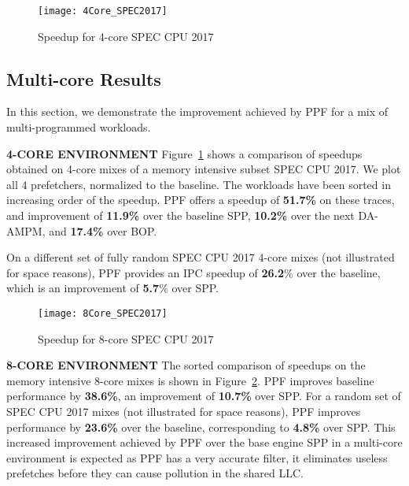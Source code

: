 \begin{figure}[ht]
\texttt{[image: 4Core\_SPEC2017]}
\caption{Speedup for 4-core SPEC CPU 2017}
\label{Fig:4Core_SPEC2017}
\end{figure}

\subsection{Multi-core Results}
\label{Results-Multi}
In this section, we demonstrate the improvement achieved by PPF for a mix of
multi-programmed workloads.
\newline

\noindent \textbf{4-CORE ENVIRONMENT}
\newline
Figure~\ref{Fig:4Core_SPEC2017} shows a comparison of speedups obtained on
4-core mixes of a memory intensive subset SPEC CPU 2017. We plot all 4
prefetchers, normalized to the baseline. The workloads have been sorted in
increasing order of the speedup. PPF offers a speedup of \textbf{51.7\%} on
these traces, and improvement of \textbf{11.9\%} over the baseline SPP,
\textbf{10.2\%} over the next DA-AMPM, and \textbf{17.4\%} over BOP.

On a different set of fully random SPEC CPU 2017 4-core mixes (not illustrated
for space reasons), PPF provides an IPC speedup of \textbf{26.2}\% over the
baseline, which is an improvement of \textbf{5.7}\% over SPP.


\begin{figure}[ht]
\texttt{[image: 8Core\_SPEC2017]}
\caption{Speedup for 8-core SPEC CPU 2017}
\label{Fig:8Core_SPEC2017}
\end{figure}

\noindent \textbf{8-CORE ENVIRONMENT}
\newline
The sorted comparison of speedups on the memory intensive 8-core mixes is
shown in Figure~\ref{Fig:8Core_SPEC2017}. PPF improves baseline performance
by \textbf{38.6\%}, an improvement of \textbf{10.7\%} over SPP. For a random
set of SPEC CPU 2017 mixes (not illustrated for space reasons), PPF improves
performance by \textbf{23.6\%} over the baseline, corresponding to
\textbf{4.8\%} over SPP. This increased improvement achieved by PPF over the
base engine SPP in a multi-core environment is expected as PPF has a very
accurate filter, it eliminates useless prefetches before they can cause
pollution in the shared LLC.

